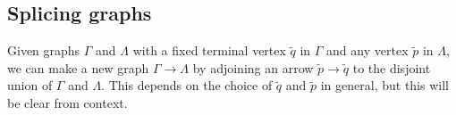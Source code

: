 \documentclass[draft]{article}
\newcommand{\qo}{\tilde{q}}
\newcommand{\pin}{\tilde{p}}
\theoremstyle{plain}
\theoremstyle{definition}
\begin{document}

\subsection{Splicing graphs}

Given graphs $\Gamma$ and $\Lambda$ with a fixed terminal vertex $\qo$ in $\Gamma$ and any vertex $\pin$ in $\Lambda$, we can make a new graph $\Gamma \rightarrow \Lambda$ by adjoining an arrow $\pin \rightarrow \qo$ to the disjoint union of $\Gamma$ and $\Lambda$. This depends on the choice of $\qo$ and $\pin$ in general, but this will be clear from context. 
\end{document}
